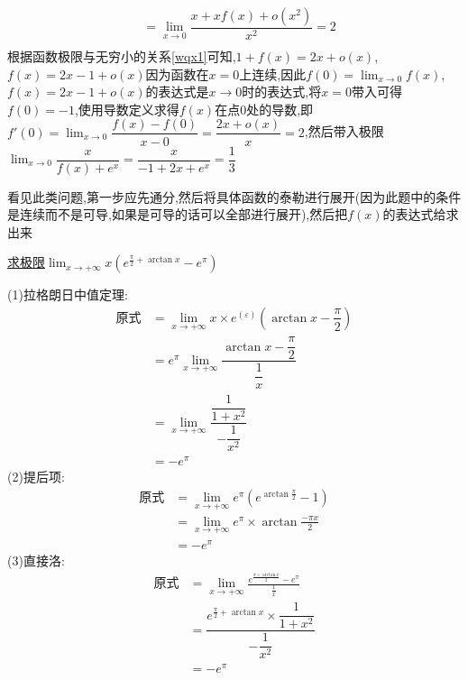\documentclass[8pt a4paper, oneside, UTF8]{ctexbook}
\begin{document}
\begin{sloppypar}
\begin{solution}
\begin{equation*}
\begin{split}
                & = \lim_{x \to 0}\dfrac{x+xf(x)+o(x^2)}{x^2}=2 \\
            \end{split}
        \end{equation*} 
    根据函数极限与无穷小的关系\ref{wqx1}可知,$1+f(x)=2x+o(x)$,$f(x)=2x-1+o(x)$因为函数在$x=0$上连续,因此$f(0)=\lim_{x\to 0}f(x)$,$f(x)=2x-1+o(x)$的表达式是$x\to 0$时的表达式,将$x=0$带入可得$f(0)=-1$,使用导数定义求得$f(x)$在点0处的导数,即$f'(0)=\lim_{x \to 0}\dfrac{f(x)-f(0)}{x-0}=\dfrac{2x+o(x)}{x}=2$,然后带入极限$\lim_{x\to 0}\dfrac{x}{f(x)+e^x}=\dfrac{x}{-1+2x+e^x}=\dfrac{1}{3}$
    \end{solution}
    \begin{note}
        看见此类问题,第一步应先通分,然后将具体函数的泰勒进行展开(因为此题中的条件是连续而不是可导,如果是可导的话可以全部进行展开),然后把$f(x)$的表达式给求出来
    \end{note}
    \begin{problem}
        \uline{求极限$\lim_{x\to +\infty}x(e^{\frac{\pi}{2}+\arctan x}-e^\pi)$}
    \end{problem}
    \begin{solution}
        (1)拉格朗日中值定理:
        \begin{align*}
            \text{原式} & = \lim_{x\to +\infty}x\times e^{(\varepsilon)}(\arctan x -\dfrac{\pi}{2})\\
            & = e^{\pi} \lim_{x\to +\infty}\dfrac{\arctan x -\dfrac{\pi}{2}}{\dfrac1x}\\
            & =\lim_{x\to +\infty} \dfrac{\dfrac{1}{1+x^2}}{-\dfrac{1}{x^2}}\\
            & =-e^\pi 
        \end{align*}
        (2)提后项:
        \begin{align*}
            \text{原式} & = \lim_{x\to +\infty}e^\pi(e^{\arctan \frac{\pi}{2}}-1)\\
            & =\lim_{x\to +\infty}e^\pi\times\arctan \frac{-\pi x}{2}\\
            & =-e^\pi
        \end{align*}
        (3)直接洛:
        \begin{align*}
          \text{原式} & = \lim_{x\to +\infty}\frac{e^{\frac{\pi+\arctan x}{2}}-e^\pi}{\frac{1}{x}} \\
          & = \dfrac{e^{\frac{\pi}{2}+\arctan x}\times\dfrac{1}{1+x^{2}}}{-\dfrac{1}{x^{2}}} \\
          & = -e^\pi
        \end{align*}

\end{solution}
\end{sloppypar}
\end{document}
